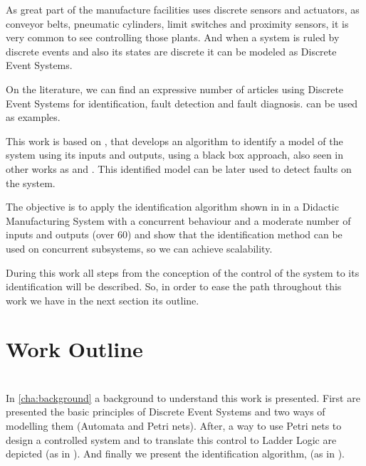 
As great part of the manufacture facilities uses discrete sensors and actuators,
as conveyor belts, pneumatic cylinders, limit switches and proximity sensors, it
is very common to see \PLCs{} controlling those plants. And when a system is ruled
by discrete events and also its states are discrete it can be modeled as
Discrete Event Systems.

On the literature, we can find an expressive number of articles using Discrete
Event Systems for identification, fault detection and fault diagnosis.
\cite{veras2018distributed,cabral2017synchronous,kumar2014comments,klein2005fault}
can be used as examples.

This work is based on \cite{moreira2018enhanced}, that
develops an algorithm to identify a model of the system using its inputs
and outputs, using a black box approach, also seen in other works as
\cite{klein2005fault} and \cite{roth2009fdi}. This identified model can be later
used to detect faults on the system.

The objective is to apply the identification algorithm shown in
\cite{moreira2018enhanced} in a Didactic Manufacturing System with a
concurrent behaviour and a moderate number of inputs and outputs (over 60) and
show that the identification method can be used on concurrent subsystems, so we can
achieve scalability.


During this work all steps from the conception of the control of the system to
its identification will be described. So, in order to ease the path throughout
this work we have in the next section its outline.

\section{Work Outline}
\label{sec:thesisOutline}

\paragraph{} ~\\
In \autoref{cha:background} a background to understand
this work is presented. First are presented the basic principles of Discrete
Event Systems and two
ways of modelling them (Automata and Petri nets). After, a way to use Petri nets to design
a controlled system and to translate this control to Ladder Logic are depicted (as
in \cite{moreira2013bridging}).
And finally we present the identification algorithm,
\DAOCT{} (as in \cite{moreira2018enhanced}).

